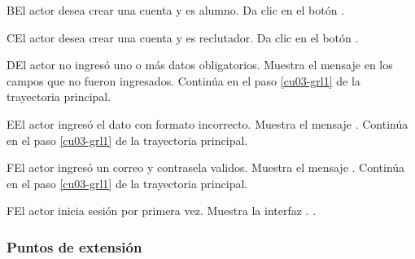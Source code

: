 \begin{UCtrayectoriaA}{B}{El actor desea crear una cuenta y es alumno.}
	\UCpaso [\UCactor] Da clic en el botón 
	.
\end{UCtrayectoriaA} 

\begin{UCtrayectoriaA}{C}{El actor desea crear una cuenta y es reclutador.}
	\UCpaso [\UCactor] Da clic en el botón 
	.
\end{UCtrayectoriaA} 

\begin{UCtrayectoriaA}{D}{El actor no ingresó uno o más datos obligatorios.}
	\UCpaso [\UCsist] Muestra el mensaje  en los campos que no
	fueron ingresados.
	\UCpaso [\UCsist] Continúa en el paso \ref{cu03-grl1} de la trayectoria principal.
\end{UCtrayectoriaA} 

\begin{UCtrayectoriaA}{E}{El actor ingresó el dato con formato incorrecto.}
	\UCpaso [\UCsist] Muestra el mensaje .
	\UCpaso [\UCsist] Continúa en el paso \ref{cu03-grl1} de la trayectoria principal.
\end{UCtrayectoriaA} 

\begin{UCtrayectoriaA}{F}{El actor ingresó un correo y contrasela validos.}
	\UCpaso [\UCsist] Muestra el mensaje .
	\UCpaso [\UCsist] Continúa en el paso \ref{cu03-grl1} de la trayectoria principal.
\end{UCtrayectoriaA} 

\begin{UCtrayectoriaA}{F}{El actor inicia sesión por primera vez.}
	\UCpaso [\UCsist] Muestra la interfaz .
	.
\end{UCtrayectoriaA} 




\subsubsection{Puntos de extensión}

